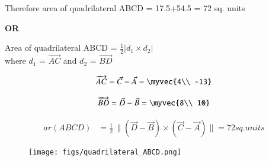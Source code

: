 \documentclass[journal]{IEEEtran}
\begin{document}
Therefore area of quadrilateral ABCD = 17.5+54.5 = 72 sq. units


\begin{center}
    \textbf{OR}
\end{center}

Area of quadrilateral ABCD = $\frac{1}{2}|d_{1}\times d_{2}|$\\
where $d_{1}$ = $\overrightarrow{AC}$  and $d_{2}$ = $\overrightarrow{BD}$


\begin{align}
    \overrightarrow{AC}  =   \vec{C}   -   \vec{A}   =  \myvec{4\\
-13}
\end{align}

\begin{align}
    \overrightarrow{BD}  =   \vec{D}   -   \vec{B}   =  \myvec{8\\
10}
\end{align}

\begin{align}
ar(ABCD) &= \frac{1}{2} \, \|(\vec{D} - \vec{B}) \times (\vec{C} - \vec{A}) \|  =  72  sq. units
\end{align}

\begin{figure}
    \centering
    \texttt{[image: figs/quadrilateral\_ABCD.png]}
    \caption{}
    \label{fig:placeholder}
\end{figure}
\end{document}
